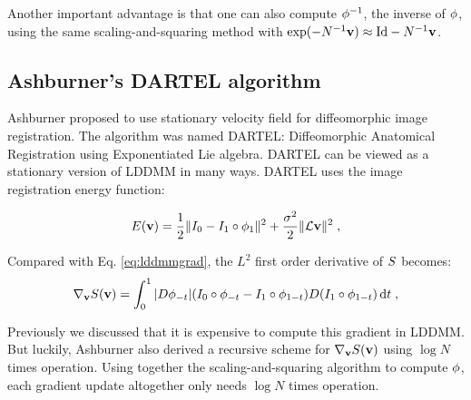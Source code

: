 \documentclass[letterpaper,12pt]{article}
\begin{document}
Another important advantage is that one can also compute $\phi^{-1}$, the inverse of $\phi$, using the same scaling-and-squaring method with $\exp(-N^{-1} \mathbf{v}) \approx \text{Id} - N^{-1}\mathbf{v}$. 


\subsection{Ashburner's DARTEL algorithm}

Ashburner proposed to use stationary velocity field for diffeomorphic image registration. The algorithm was named DARTEL: Diffeomorphic Anatomical Registration using Exponentiated Lie algebra. DARTEL can be viewed as a stationary version of LDDMM in many ways. DARTEL uses the image registration energy
 function:

\begin{align}
E(\mathbf{v}) = \frac{1}{2} \| I_0 - I_1 \circ \phi_{1} \|^2 
+ 
\frac{\sigma^2}{2} \| \mathcal{L} \mathbf{v}\|^2  \;,
\label{eq:dartel}
\end{align}

Compared with Eq. \ref{eq:lddmmgrad}, the $L^2$ first order derivative of $S$ becomes:
\begin{align}
\nabla_{\mathbf{v}} S(\mathbf{v}) = \int_{0}^{1} 
|D\phi_{-t}|
(I_0 \circ \phi_{-t} - I_1 \circ \phi_{1-t})
D(I_1 \circ \phi_{1-t})
\, \text{d} t \; ,
\label{eq:dartelds}
\end{align}

Previously we discussed that it is expensive to compute this gradient in LDDMM. But luckily, Ashburner \cite{Ashburner2007} also derived a recursive scheme for $\nabla_{\mathbf{v}} S(\mathbf{v})$ using $\log N$ times operation. Using together the scaling-and-squaring algorithm to compute $\phi$, each gradient update altogether only needs $\log N$ times operation. 
\end{document}
